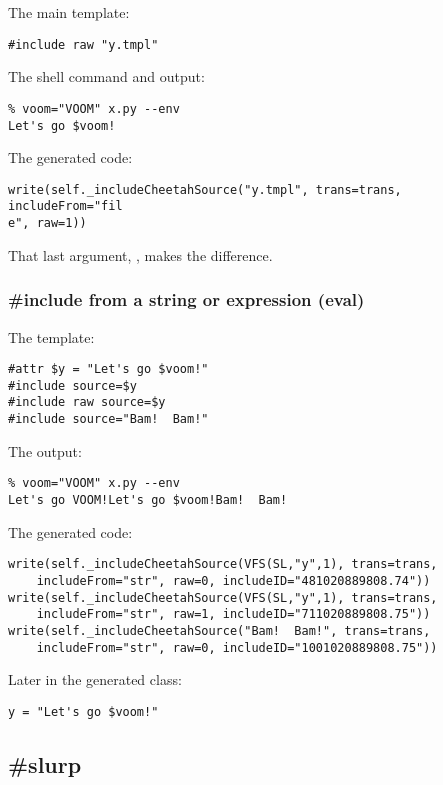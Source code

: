 The main template:
\begin{verbatim}
#include raw "y.tmpl"
\end{verbatim}

The shell command and output:
\begin{verbatim}
% voom="VOOM" x.py --env
Let's go $voom!
\end{verbatim}

The generated code:
\begin{verbatim}
write(self._includeCheetahSource("y.tmpl", trans=trans, includeFrom="fil
e", raw=1))
\end{verbatim}

That last argument, , makes the difference.

\subsubsection{\#include from a string or expression (eval)}
\label{output.include.expression}

The template:
\begin{verbatim}
#attr $y = "Let's go $voom!"
#include source=$y
#include raw source=$y
#include source="Bam!  Bam!"
\end{verbatim}

The output:
\begin{verbatim}
% voom="VOOM" x.py --env
Let's go VOOM!Let's go $voom!Bam!  Bam!
\end{verbatim}

The generated code:
\begin{verbatim}
write(self._includeCheetahSource(VFS(SL,"y",1), trans=trans, 
    includeFrom="str", raw=0, includeID="481020889808.74"))
write(self._includeCheetahSource(VFS(SL,"y",1), trans=trans, 
    includeFrom="str", raw=1, includeID="711020889808.75"))
write(self._includeCheetahSource("Bam!  Bam!", trans=trans, 
    includeFrom="str", raw=0, includeID="1001020889808.75"))
\end{verbatim}

Later in the generated class:
\begin{verbatim}
y = "Let's go $voom!"
\end{verbatim}


\subsection{\#slurp}
\label{output.slurp}

